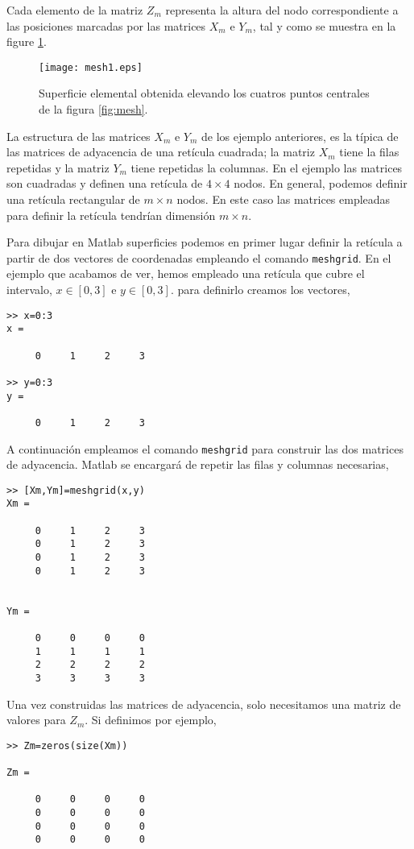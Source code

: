 Cada elemento de la matriz $Z_m$ representa la altura del nodo correspondiente a las posiciones marcadas por las matrices $X_m$ e $Y_m$, tal y como se muestra en la figure \ref{fig:mesh1}.

\begin{figure}[h]
\centering
\texttt{[image: mesh1.eps]}
\caption{Superficie elemental obtenida elevando los cuatros puntos centrales de la figura \ref{fig:mesh}.}
\label{fig:mesh1}
\end{figure}

La estructura de las matrices $X_m$ e $Y_m$ de los ejemplo anteriores, es la típica de las matrices de adyacencia de una retícula cuadrada; la matriz  $X_m$ tiene la filas repetidas y la matriz $Y_m$ tiene repetidas la columnas. En el ejemplo las matrices son cuadradas y definen una retícula de $4\times 4$ nodos. En general, podemos definir una retícula rectangular de $m\times n$ nodos. En este caso las matrices empleadas para definir la retícula tendrían dimensión $m\times n$.

Para dibujar en Matlab superficies podemos en primer lugar definir la retícula a partir de dos vectores de coordenadas empleando el comando \texttt{meshgrid}. En el ejemplo que acabamos de ver, hemos empleado una retícula que cubre el intervalo, $x\in[0,3]$ e $y\in[0,3]$. para definirlo creamos los vectores,

\begin{verbatim}
>> x=0:3
x =

     0     1     2     3

>> y=0:3
y =

     0     1     2     3
\end{verbatim}

A continuación empleamos el comando \texttt{meshgrid} para construir las dos matrices de adyacencia. Matlab se encargará de repetir las filas y columnas necesarias,

\begin{verbatim}
>> [Xm,Ym]=meshgrid(x,y)
Xm =

     0     1     2     3
     0     1     2     3
     0     1     2     3
     0     1     2     3


Ym =

     0     0     0     0
     1     1     1     1
     2     2     2     2
     3     3     3     3

\end{verbatim}

Una vez construidas las matrices de adyacencia, solo necesitamos una matriz de valores para $Z_m$. Si definimos por ejemplo,
\begin{verbatim}
>> Zm=zeros(size(Xm))

Zm =

     0     0     0     0
     0     0     0     0
     0     0     0     0
     0     0     0     0
\end{verbatim}

